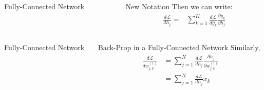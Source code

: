\documentclass{beamer}
\begin{document}
\begin{frame}
  \begin{columns}
    \begin{column}{0.5\textwidth}
      \begin{block}{Fully-Connected Network}
        
      \end{block}
    \end{column}
    \begin{column}{0.5\textwidth}
      \begin{block}{New Notation}
        Then we can write:
        \begin{align*}
          \frac{d{\mathcal L}}{dh_j}=
          &\sum_{k=1}^K\frac{d{\mathcal L}}{d\hat{y}_k}
          \frac{\partial\hat{y}_k}{\partial h_j}
        \end{align*}
      \end{block}
    \end{column}
  \end{columns}
\end{frame}

\begin{frame}
  \begin{columns}
    \begin{column}{0.5\textwidth}
      \begin{block}{Fully-Connected Network}
        
      \end{block}
    \end{column}
    \begin{column}{0.5\textwidth}
      \begin{block}{Back-Prop in a Fully-Connected Network}
        Similarly,
        \begin{align*}
          \frac{d{\mathcal L}}{dw_{j,k}^{(1)}}
          &=
          \sum_{j=1}^N\frac{d{\mathcal L}}{dh_j}\frac{\partial h_j}{\partial w_{j,k}^{(1)}}\\
          &=
          \sum_{j=1}^N\frac{d{\mathcal L}}{dh_j}x_k
        \end{align*}
      \end{block}
    \end{column}
  \end{columns}
\end{frame}
\end{document}

